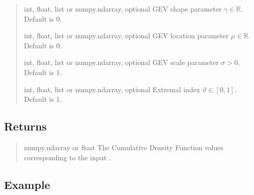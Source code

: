\documentclass[a4paper,11pt,openany,english]{sphinxmanual}
\begin{document}
\begin{fulllineitems}
\begin{quote}
\begin{description}
\sphinxAtStartPar
int, float, list or numpy.ndarray, optional
GEV shape parameter \(\gamma\in \mathbb{R}\). Default is 0.

\sphinxAtStartPar
int, float, list or numpy.ndarray, optional
GEV location parameter \(\mu\in \mathbb{R}\). Default is 0.

\sphinxAtStartPar
int, float, list or numpy.ndarray, optional
GEV scale parameter \(\sigma>0\). Default is 1.

\sphinxAtStartPar
int, float, list or numpy.ndarray, optional
Extremal index \(\vartheta\in [0, 1]\). Default is 1.

\end{description}\end{quote}


\subsection{Returns}
\label{\detokenize{api_misc:id15}}\begin{quote}\begin{description}
\sphinxAtStartPar
numpy.ndarray or float
The Cumulative Density Function values corresponding to the input .

\end{description}\end{quote}


\subsection{Example}
\label{\detokenize{api_misc:id16}}
\begin{sphinxVerbatim}[commandchars=\\\{\}]
   
  \PYG{p}{[}    \PYG{p}{]}
    
\end{sphinxVerbatim}

\end{fulllineitems}
\end{document}
